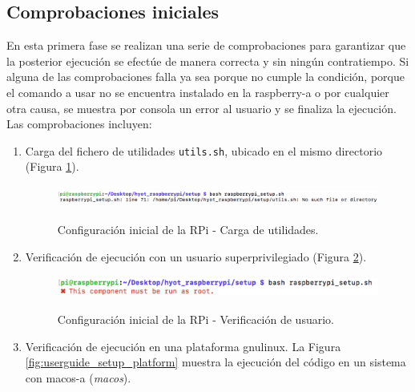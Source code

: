 \documentclass[12pt,a4paper, twoside]{report}
\begin{document}
	\subsection{Comprobaciones iniciales}
	
	En esta primera fase se realizan una serie de comprobaciones para garantizar que la posterior ejecución se efectúe de manera correcta y sin ningún contratiempo. Si alguna de las comprobaciones falla ya sea porque no cumple la condición, porque el comando a usar no se encuentra instalado en la \gls{raspberry-a} o por cualquier otra causa, se muestra por consola un error al usuario y se finaliza la ejecución. Las comprobaciones incluyen:

	\begin{enumerate}
		\item Carga del fichero de utilidades \texttt{utils.sh}, ubicado en el mismo directorio (Figura \ref{fig:userguide_setup_utils}).

		\begin{figure}[!ht]   
			\caption{Configuración inicial de la RPi - Carga de utilidades.} 
			\begin{center} 
				\includegraphics[width=14cm,height=0.7cm]{Images/userGuide/setup/utils} \\
				\label{fig:userguide_setup_utils} 
			\end{center}  
		\end{figure}

		\item Verificación de ejecución con un usuario superprivilegiado (Figura \ref{fig:userguide_setup_root}).
		
		\begin{figure}[!ht]   
			\caption{Configuración inicial de la RPi - Verificación de usuario.} 
			\begin{center} 
				\includegraphics[width=13cm,height=0.7cm]{Images/userGuide/setup/root} \\
				\label{fig:userguide_setup_root} 
			\end{center}  
		\end{figure}
		
		\item Verificación de ejecución en una plataforma \gls{gnulinux}. La Figura \ref{fig:userguide_setup_platform} muestra la ejecución del código en un sistema con \gls{macos-a} (\textit{\gls{macos}}). 
		

\end{enumerate}
\end{document}
